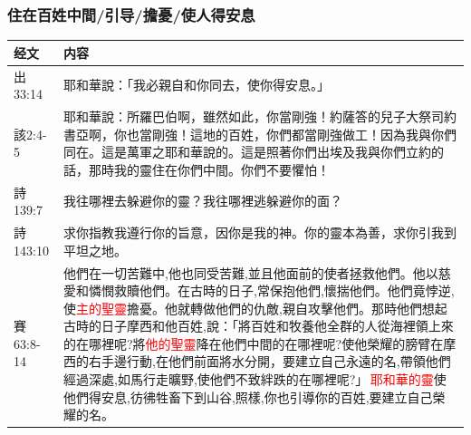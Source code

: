 \subsubsection{住在百姓中間/引导/擔憂/使人得安息}
\begin{table}[H]
\centering
\begin{tabular}{p{5em}|p{43em}}  \toprule
经文&内容\\  \midrule
出33:14&耶和華說：「我必親自和你同去，使你得安息。」\\  \midrule

該2:4-5&耶和華說：所羅巴伯啊，雖然如此，你當剛強！約薩答的兒子大祭司約書亞啊，你也當剛強！這地的百姓，你們都當剛強做工！因為我與你們同在。這是萬軍之耶和華說的。這是照著你們出埃及我與你們立約的話，那時我的靈住在你們中間。你們不要懼怕！\\  \midrule
詩139:7&我往哪裡去躲避你的靈？我往哪裡逃躲避你的面？\\  \midrule
詩143:10&求你指教我遵行你的旨意，因你是我的神。你的靈本為善，求你引我到平坦之地。\\  \midrule

賽63:8-14&他們在一切苦難中,他也同受苦難,並且他面前的使者拯救他們。他以慈愛和憐憫救贖他們。在古時的日子,常保抱他們,懷揣他們。他們竟悖逆,使\textcolor{red}{主的聖靈}擔憂。他就轉做他們的仇敵,親自攻擊他們。那時他們想起古時的日子摩西和他百姓,說：「將百姓和牧養他全群的人從海裡領上來的在哪裡呢?將\textcolor{red}{他的聖靈}降在他們中間的在哪裡呢?使他榮耀的膀臂在摩西的右手邊行動,在他們前面將水分開，要建立自己永遠的名,帶領他們經過深處,如馬行走曠野,使他們不致絆跌的在哪裡呢?」 \textcolor{red}{耶和華的靈}使他們得安息,彷彿牲畜下到山谷,照樣,你也引導你的百姓,要建立自己榮耀的名。\\\bottomrule
\end{tabular}
\end{table}




